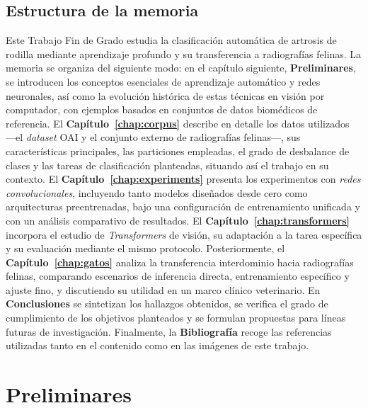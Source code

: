 \documentclass[11pt,spanish,listoffigures,listoftables]{tfgetsinf}
\begin{document}
\section{Estructura de la memoria}
Este Trabajo Fin de Grado estudia la clasificación automática de artrosis de
rodilla mediante aprendizaje profundo y su transferencia a radiografías
felinas. La memoria se organiza del siguiente modo: en el capítulo siguiente,
\textbf{Preliminares}, se introducen los conceptos esenciales de aprendizaje
automático y redes neuronales, así como la evolución histórica de estas
técnicas en visión por computador, con ejemplos basados en conjuntos de datos
biomédicos de referencia. El \textbf{Capítulo~\ref{chap:corpus}} describe en
detalle los datos utilizados —el \emph{dataset} OAI y el conjunto externo de
radiografías felinas—, sus características principales, las particiones
empleadas, el grado de desbalance de clases y las tareas de clasificación
planteadas, situando así el trabajo en su contexto. El
\textbf{Capítulo~\ref{chap:experiments}} presenta los experimentos con
\emph{redes convolucionales}, incluyendo tanto modelos diseñados desde cero
como arquitecturas preentrenadas, bajo una configuración de entrenamiento
unificada y con un análisis comparativo de resultados. El
\textbf{Capítulo~\ref{chap:transformers}} incorpora el estudio de
\emph{Transformers} de visión, su adaptación a la tarea específica y su
evaluación mediante el mismo protocolo. Posteriormente, el
\textbf{Capítulo~\ref{chap:gatos}} analiza la transferencia interdominio hacia
radiografías felinas, comparando escenarios de inferencia directa, entrenamiento
específico y ajuste fino, y discutiendo su utilidad en un marco clínico
veterinario. En \textbf{Conclusiones} se sintetizan los hallazgos obtenidos, se
verifica el grado de cumplimiento de los objetivos planteados y se formulan
propuestas para líneas futuras de investigación. Finalmente, la
\textbf{Bibliografía} recoge las referencias utilizadas tanto en el contenido como en las imágenes de este trabajo.



\chapter{Preliminares}  %
\end{document}
